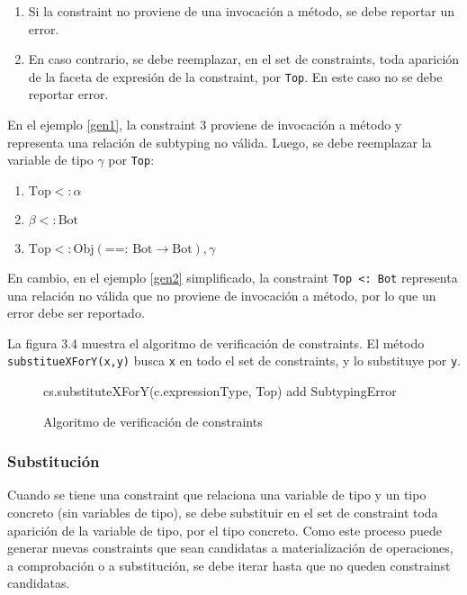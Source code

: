 \begin{enumerate}
  \item Si la constraint no proviene de una invocación a método, se debe reportar un error.
  \item En caso contrario, se debe reemplazar, en el set de constraints, toda aparición de la faceta de expresión de la constraint, por \texttt{Top}. En este caso no se debe reportar error.
\end{enumerate}

En el ejemplo \ref{gen1}, la constraint 3 proviene de invocación a método y representa una relación de subtyping no válida. Luego, se debe reemplazar la variable de tipo $\gamma$ por \texttt{Top}:

\begin{enumerate}
  \item $\text{Top} <: \alpha$
  \item $\beta <: \text{Bot}$
  \item $\text{Top} <: \text{Obj}(\text{==: }\text{Bot} \rightarrow \text{Bot}), \gamma$
\end{enumerate}

En cambio, en el ejemplo \ref{gen2} simplificado, la constraint \texttt{Top <: Bot} representa una relación no válida que no proviene de invocación a método, por lo que un error debe ser reportado.

La figura 3.4 muestra el algoritmo de verificación de constraints. El método \texttt{substitueXForY(x,y)} busca \texttt{x} en todo el set de constraints, y lo substituye por \texttt{y}.

\begin{figure}[ht]
  \centering
  \label{pseudocheck}
  \begin{mdframed}
    \begin{algorithmic}
              \State cs.substituteXForY(c.expressionType, Top)
            \EndIf
              \State add SubtypingError
            \EndIf
          \EndFor
      \EndFunction
    \end{algorithmic}
  \end{mdframed}
  \caption{Algoritmo de verificación de constraints}
\end{figure}


\subsubsection{Substitución}
Cuando se tiene una constraint que relaciona una variable de tipo y un tipo concreto (sin variables de tipo), se debe substituir en el set de constraint toda aparición de la variable de tipo, por el tipo concreto. Como este proceso puede generar nuevas constraints que sean candidatas a materialización de operaciones, a comprobación o a substitución, se debe iterar hasta que no queden constrainst candidatas.

